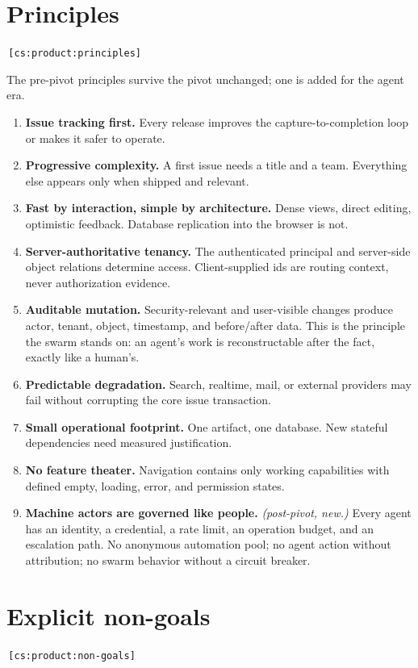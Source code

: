 \documentclass[11pt,a4paper]{report}
\newcommand{\cs}[1]{\,\texttt{\scriptsize[cs:#1]}\label{cs:#1}}
\begin{document}
\section{Principles}
\cs{product:principles}

The pre-pivot principles survive the pivot unchanged; one is added for
the agent era.

\begin{enumerate}[label=\arabic*.]
\item \textbf{Issue tracking first.} Every release improves the
  capture-to-completion loop or makes it safer to operate.
\item \textbf{Progressive complexity.} A first issue needs a title and a
  team. Everything else appears only when shipped and relevant.
\item \textbf{Fast by interaction, simple by architecture.} Dense views,
  direct editing, optimistic feedback. Database replication into the
  browser is not.
\item \textbf{Server-authoritative tenancy.} The authenticated principal
  and server-side object relations determine access. Client-supplied ids
  are routing context, never authorization evidence.
\item \textbf{Auditable mutation.} Security-relevant and user-visible
  changes produce actor, tenant, object, timestamp, and before/after data.
  This is the principle the swarm stands on: an agent's work is
  reconstructable after the fact, exactly like a human's.
\item \textbf{Predictable degradation.} Search, realtime, mail, or
  external providers may fail without corrupting the core issue
  transaction.
\item \textbf{Small operational footprint.} One artifact, one database.
  New stateful dependencies need measured justification.
\item \textbf{No feature theater.} Navigation contains only working
  capabilities with defined empty, loading, error, and permission states.
\item \textbf{Machine actors are governed like people.} \emph{(post-pivot,
  new.)} Every agent has an identity, a credential, a rate limit, an
  operation budget, and an escalation path. No anonymous automation pool;
  no agent action without attribution; no swarm behavior without a
  circuit breaker.
\end{enumerate}

\section{Explicit non-goals}
\cs{product:non-goals}
\end{document}
